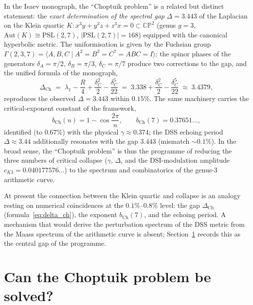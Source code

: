 \documentclass[11pt,a4paper]{article}
\theoremstyle{definition}
\theoremstyle{remark}
\begin{document}
In the Isaev monograph, the ``Choptuik problem'' is a related but distinct
statement: the \emph{exact determination of the spectral gap}
$\Delta = 3.443$ of the Laplacian on the Klein quartic
$K\colon x^3y + y^3z + z^3x = 0 \subset \mathbb{CP}^2$ (genus $g = 3$,
$\mathrm{Aut}(K) \cong \mathrm{PSL}(2,7)$, $|\mathrm{PSL}(2,7)| = 168$)
equipped with the canonical hyperbolic metric. The uniformisation is given
by the Fuchsian group $\Gamma(2,3,7) = \langle A,B,C \mid A^2 = B^3 = C^7
= ABC = I \rangle$; the spinor phases of the generators $\delta_A = \pi/2$,
$\delta_B = \pi/3$, $\delta_C = \pi/7$ produce two corrections to the gap,
and the unified formula of the monograph,
\begin{equation}\label{eq:delta_ch}
\Delta_{\mathrm{Ch}} \;=\; \lambda_1 - \frac{R}{4} + \frac{\delta_C^2}{2}
- \frac{\delta_C^5}{22} \;=\; 3.338 + \frac{\delta_C^2}{2} - \frac{\delta_C^5}{22}
\;\approx\; 3.4379,
\end{equation}
reproduces the observed $\Delta = 3.443$ within $0.15\%$. The same machinery
carries the critical-exponent constant of the framework,
\begin{equation}\label{eq:bch}
b_{\mathrm{Ch}}(n) = 1 - \cos\frac{2\pi}{n},
\qquad b_{\mathrm{Ch}}(7) = 0.37651\ldots,
\end{equation}
identified (to $0.67\%$) with the physical $\gamma \approx 0.374$; the DSS
echoing period $\Delta \approx 3.44$ additionally resonates with the gap
$3.443$ (mismatch $\sim 0.1\%$). In the broad sense, the ``Choptuik problem''
is thus the programme of reducing the three numbers of critical collapse
($\gamma$, $\Delta$, and the DSI-modulation amplitude
$c_{K3} = 0.040177576\ldots$) to the spectrum and combinatorics of the
genus-3 arithmetic curve.

\begin{honestybox}
At present the connection between the Klein quartic and collapse is an
analogy resting on numerical coincidences at the $0.1\%$--$0.8\%$ level: the
gap $\Delta_{\mathrm{Ch}}$ (formula~\eqref{eq:delta_ch}), the exponent
$b_{\mathrm{Ch}}(7)$, and the echoing period. A mechanism that would derive
the perturbation spectrum of the DSS metric from the Maass spectrum of the
arithmetic curve is absent; Section~\ref{sec:solvability} records this as
the central gap of the programme.
\end{honestybox}

\section{Can the Choptuik problem be solved?}\label{sec:solvability}
\end{document}
